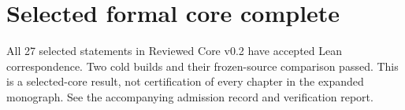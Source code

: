 \section*{Selected formal core complete}
All 27 selected statements in Reviewed Core v0.2 have accepted Lean correspondence. Two cold builds and their frozen-source comparison passed. This is a selected-core result, not certification of every chapter in the expanded monograph. See the accompanying admission record and verification report.
